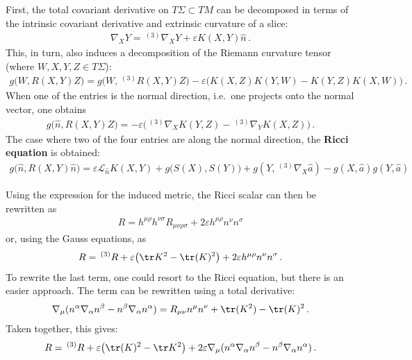     First, the total covariant derivative on $T\Sigma\subset TM$ can be decomposed in terms of the intrinsic covariant derivative and extrinsic curvature of a slice:
    \begin{gather}
        \nabla_XY = \,^{(3)}\nabla_XY + \varepsilon K(X,Y)\widehat{n}\,.
    \end{gather}
    This, in turn, also induces a decomposition of the Riemann curvature tensor (where $W,X,Y,Z\in T\Sigma$):
    \begin{gather}
        g\bigl(W,R(X,Y)Z\bigr) = g\bigl(W,\,^{(3)}R(X,Y)Z\bigr) - \varepsilon\bigl(K(X,Z)K(Y,W)-K(Y,Z)K(X,W)\bigr)\,.
    \end{gather}
    When one of the entries is the normal direction, i.e.~one projects onto the normal vector, one obtains
    \begin{gather}
        g\bigl(\widehat{n},R(X,Y)Z\bigr) = -\varepsilon\bigl(\,^{(3)}\nabla_XK(Y,Z)-\,^{(3)}\nabla_YK(X,Z)\bigr)\,.
    \end{gather}
    The case where two of the four entries are along the normal direction, the \textbf{Ricci equation} is obtained:
    \begin{gather}
        g\bigl(\widehat{n},R(X,Y)\widehat{n}\bigr) = \varepsilon\mathcal{L}_{\widehat{n}}K(X,Y) + g\bigl(S(X),S(Y)\bigr) + g(Y,\,^{(3)}\nabla_X\widehat{a}) - g(X,\widehat{a})g(Y,\widehat{a})
    \end{gather}

    Using the expression for the induced metric, the Ricci scalar can then be rewritten as
    \begin{gather}
        R = h^{\mu\rho}h^{\nu\sigma}R_{\mu\nu\rho\sigma}+2\varepsilon h^{\mu\rho}n^\nu n^\sigma
    \end{gather}
    or, using the Gauss equations, as
    \begin{gather}
        R = \,^{(3)}R+\varepsilon\bigl(\tr K^2 - \tr(K)^2\bigr)+2\varepsilon h^{\mu\rho}n^\nu n^\sigma\,.
    \end{gather}
    To rewrite the last term, one could resort to the Ricci equation, but there is an easier approach. The term can be rewritten using a total derivative:
    \begin{gather}
        \nabla_\mu(n^\alpha\nabla_\alpha n^\beta-n^\beta\nabla_\alpha n^\alpha) = R_{\mu\nu}n^\mu n^\nu + \tr(K^2) - \tr(K)^2\,.
    \end{gather}
    Taken together, this gives:
    \begin{gather}
        R = \,^{(3)}R+\varepsilon\bigl(\tr(K)^2-\tr K^2\bigr)+2\varepsilon\nabla_\mu(n^\alpha\nabla_\alpha n^\beta-n^\beta\nabla_\alpha n^\alpha)\,.
    \end{gather}

